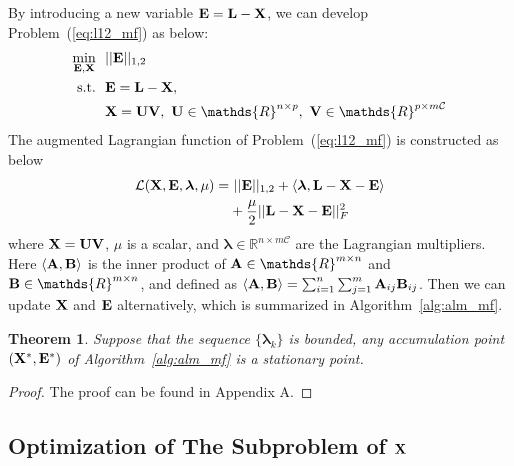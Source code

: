 \documentclass[letterpaper]{article}
\newtheorem{theorem}{Theorem}
\def\bA{{\bf A}}
\def\bB{{\bf B}}
\def\bE{{\bf E}}
\def\blambda{{\bm \lambda}}
\def\calL{{\mathcal{L}}}
\def\calC{{\mathcal{C}}}
\def\bL{{\bf L}}
\def\bU{{\bf U}}
\def\bV{{\bf V}}
\def\dsR{\mathds{R}}
\def\bX{{\bf X}}
\def\bA{{\bf A}}
\def\bX{{\bf X}}
\def\st{{\text{s.t.}}}
\begin{document}
By introducing a new variable $\bE = \bL - \bX$, we can develop Problem~(\ref{eq:l12_mf}) as below:
\begin{align}\label{eq:mf_l21_constrained}
  \min_{\bE, \bX} ~&~ || \bE ||_{1,2}      \nonumber \\
  \st             ~&~ \bE = \bL - \bX  ,   \nonumber \\
                  ~&~ \bX = \bU \bV,~\bU \in \dsR^{n \times p},~\bV \in \dsR^{p \times m \calC}
\end{align}
The augmented Lagrangian function of Problem~(\ref{eq:l12_mf}) is constructed as below
\begin{align}\label{eq:lagrangian_l21}
  \calL (\bX, \bE, \blambda, \mu) = &~ || \bE ||_{1,2} + \langle \blambda, \bL - \bX - \bE \rangle      \nonumber \\
                                    & + \frac{\mu}{2} || \bL - \bX - \bE ||_F^2
\end{align}
\noindent
where $\bX = \bU \bV$, $\mu$ is a scalar,
and $\blambda \in \dsR^{n \times m\calC}$ are the Lagrangian multipliers.
Here $\langle \bA, \bB \rangle$ is the inner product of $\bA \in \dsR^{m \times n}$ and $\bB \in \dsR^{m \times n}$, and defined as $\langle \bA, \bB \rangle = \sum_{i=1}^{n} \sum_{j=1}^{m} \bA_{ij} \bB_{ij}$.
Then we can update $\bX$ and $\bE$ alternatively, which is summarized in Algorithm~\ref{alg:alm_mf}.




\begin{theorem}
\label{theorem:alm_convergence}
  Suppose that the sequence $\{ \blambda_{k} \}$ is bounded, any accumulation point $(\bX^*, \bE^*)$ of Algorithm~\ref{alg:alm_mf} is a stationary point.
\end{theorem}

\begin{proof}
\label{proof:proof_AA}
  The proof can be found in Appendix A.
\end{proof}




\subsection{Optimization of The Subproblem of $\bX$}
\end{document}
